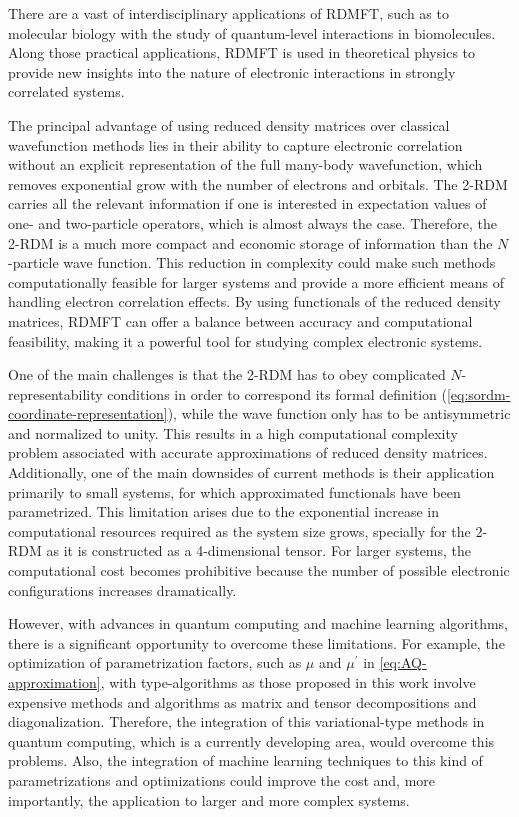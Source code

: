There are a vast of interdisciplinary applications of RDMFT, such as
to molecular biology with the study of quantum-level interactions in biomolecules.
Along those practical applications, RDMFT is used in theoretical physics
to provide new insights into the nature of electronic interactions in strongly
correlated systems.

The principal advantage of using reduced density matrices over classical
wavefunction methods lies in their ability to capture electronic correlation 
without an explicit representation of the 
full many-body wavefunction, which removes exponential grow with the number of 
electrons and orbitals.
The 2-RDM carries all the relevant information if one is interested in
expectation values of one- and two-particle operators, which is almost always
the case.
Therefore, the 2-RDM is a much more compact and economic storage of
information than the $N$-particle wave function.
This reduction in complexity could make such methods computationally feasible
for larger systems and provide a more efficient means of handling electron
correlation effects.
By using functionals of the reduced density matrices, RDMFT can offer a 
balance between accuracy and computational feasibility, making it a powerful 
tool for studying complex electronic systems.

One of the main challenges is that the 2-RDM has to obey complicated
$N$-representability conditions in order to correspond its formal definition
(\cref{eq:sordm-coordinate-representation}), while the wave function only has
to be antisymmetric and normalized to unity.
This results in a high computational complexity problem associated with accurate
approximations of reduced density matrices.
Additionally, one of the main downsides of current methods is their 
application primarily to small systems, for which approximated functionals
have been parametrized.
This limitation arises due to the exponential increase in computational 
resources required as the system size grows, specially for the 2-RDM as it
is constructed as a 4-dimensional tensor.
For larger systems, the computational cost becomes prohibitive because the 
number of possible electronic configurations increases dramatically.

However, with advances in quantum computing and machine learning algorithms,
there is a significant opportunity to overcome these limitations.
For example, the optimization of parametrization factors, such as $\mu$ and
$\mu^{\prime}$ in \cref{eq:AQ-approximation}, with type-algorithms as those
proposed in this work involve expensive methods and algorithms as matrix and
tensor decompositions and diagonalization.
Therefore, the integration of this variational-type methods in quantum computing,
which is a currently developing area, would overcome this problems. 
Also, the integration of machine learning techniques to this kind of 
parametrizations and optimizations could improve the cost and, more importantly,
the application to larger and more complex systems.

